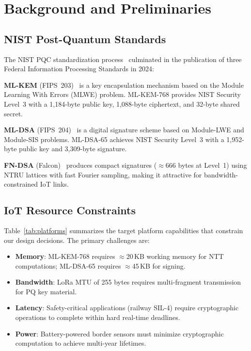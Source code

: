 \documentclass[conference,10pt]{IEEEtran}
\begin{document}
\section{Background and Preliminaries}
\label{sec:background}

\subsection{NIST Post-Quantum Standards}

The NIST PQC standardization process~\cite{nist_pqc_report} culminated in the publication of three Federal Information Processing Standards in 2024:

\textbf{ML-KEM} (FIPS~203)~\cite{fips203} is a key encapsulation mechanism based on the Module Learning With Errors (MLWE) problem. ML-KEM-768 provides NIST Security Level~3 with a 1,184-byte public key, 1,088-byte ciphertext, and 32-byte shared secret.

\textbf{ML-DSA} (FIPS~204)~\cite{fips204} is a digital signature scheme based on Module-LWE and Module-SIS problems. ML-DSA-65 achieves NIST Security Level~3 with a 1,952-byte public key and 3,309-byte signature.

\textbf{FN-DSA} (Falcon)~\cite{falcon} produces compact signatures ($\approx$666 bytes at Level~1) using NTRU lattices with fast Fourier sampling, making it attractive for bandwidth-constrained IoT links.

\subsection{IoT Resource Constraints}

Table~\ref{tab:platforms} summarizes the target platform capabilities that constrain our design decisions. The primary challenges are:

\begin{itemize}[leftmargin=*]
  \item \textbf{Memory}: ML-KEM-768 requires $\approx$20\,KB working memory for NTT computations; ML-DSA-65 requires $\approx$45\,KB for signing.
  \item \textbf{Bandwidth}: LoRa MTU of 255 bytes requires multi-fragment transmission for PQ key material.
  \item \textbf{Latency}: Safety-critical applications (railway SIL-4) require cryptographic operations to complete within hard real-time deadlines.
  \item \textbf{Power}: Battery-powered border sensors must minimize cryptographic computation to achieve multi-year lifetimes.
\end{itemize}
\end{document}
